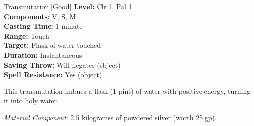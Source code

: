 {Transmutation [Good]}
{
	\textbf{Level:}
	Clr 1, Pal 1\\
	\textbf{Components:}
	V, S, M\\
	\textbf{Casting Time:}
	1 minute\\
	\textbf{Range:}
	Touch\\
	\textbf{Target:}
	Flask of water touched\\
	\textbf{Duration:}
	Instantaneous\\
	\textbf{Saving Throw:}
	Will negates (object)\\
	\textbf{Spell Resistance:}
	Yes (object)\\
}
{
	This transmutation imbues a flask (1 pint) of water with positive energy, turning it into holy water.

	\textit{Material Component}:
	2.5 kilogramss of powdered silver (worth 25 gp).

}
